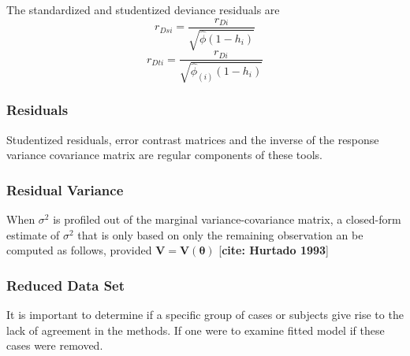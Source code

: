 \documentclass[12pt, a4paper]{report}
\theoremstyle{plain}
\theoremstyle{definition}
\theoremstyle{remark}
\begin{document}

The standardized and studentized deviance residuals are
	\[
	r_{Dsi} = \frac{r_{Di}}{\sqrt{\hat{ \phi} (1- h_{i})} }\]
	\[r_{Dti} = \frac{r_{Di}}{\sqrt{ \hat{ \phi}_{(i)}
			(1- h_{i})}}\]
	
\subsubsection*{Residuals}
Studentized residuals, error contrast matrices and the inverse of the response variance covariance matrix are regular components of these tools.


	
\subsubsection{Residual Variance}
When $\sigma^2$ is profiled out of the marginal variance-covariance matrix, a closed-form estimate of $\sigma^2$ that is only based on only the remaining observation an be computed as follows, provided $\boldsymbol{V} = \boldsymbol{V}(\boldsymbol{\theta}) $
	[\textbf{cite: Hurtado 1993}]

\subsubsection{Reduced Data Set}
It is important to determine if a specific group of cases or subjects give rise to the lack of agreement in the methods. If one were to examine fitted model if these cases were removed.
	
	
\end{document}
